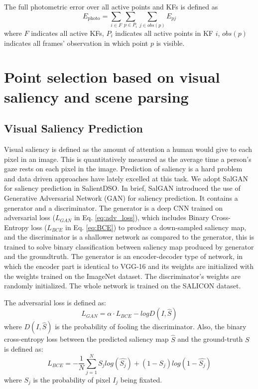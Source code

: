 \documentclass[letterpaper, 10 pt, conference]{ieeeconf}  %
\begin{document}
The full photometric error over all active points and KFs is defined as
\begin{equation}
    E_{\text{photo}} = \sum_{i \in F} \sum_{p \in P_{i}} \sum_{j \in obs(p)} E_{pj}
    \label{eq:error}
\end{equation}
where $F$ indicates all active KFs, $P_{i}$ indicates all active points in KF $i$, $obs(p)$ indicates all frames' observation in which point $p$ is visible.\\

\section{Point selection based on visual saliency and scene parsing}
\label{sec:PointSel}
\subsection{Visual Saliency Prediction}
Visual saliency is defined as the amount of attention a human would give to each pixel in an image. This is quantitatively measured as the average time a person's gaze rests on each pixel in the image. Prediction of saliency is a hard problem and data driven approaches have lately excelled at this task. We adopt SalGAN \cite{SalGAN} for saliency prediction in SalientDSO. In brief, SalGAN introduced the use of Generative Adversarial Network (GAN)\cite{GAN} for saliency prediction. It contains a generator and a discriminator. The generator is a deep CNN trained on adversarial loss ($L_{GAN}$ in Eq. \ref{eq:adv_loss}), which includes Binary Cross-Entropy loss ($L_{BCE}$ in Eq. \ref{eq:BCE}) to produce a down-sampled saliency map, and the discriminator is a shallower network as compared to the generator, this is trained to solve binary classification between saliency map produced by generator and the groundtruth. The generator is an encoder-decoder type of network, in which the encoder part is identical to VGG-16\cite{VGG16} and its weights are initialized with the weights trained on the ImageNet dataset\cite{ImageNet}. The discriminator's weights are randomly initialized. The whole network is trained on the SALICON dataset\cite{SALICON}.

The adversarial loss is defined as:
\begin{equation}
    L_{GAN} = \alpha \cdot L_{BCE} - logD(I, \hat{S})
    \label{eq:adv_loss}
\end{equation}
where $D(I, \hat{S})$ is the probability of fooling the discriminator. Also, the binary cross-entropy loss between the predicted saliency map $\hat{S}$ and the ground-truth $S$ is defined as:
\begin{equation}
    L_{BCE} = - \frac{1}{N} \sum_{j = 1}^{N} S_{j}log(\hat{S_{j}}) + (1 - S_{j})log(1 - \hat{S_{j}})
    \label{eq:BCE}
\end{equation}
where $S_{j}$ is the probability of pixel $I_{j}$ being fixated.
\end{document}
